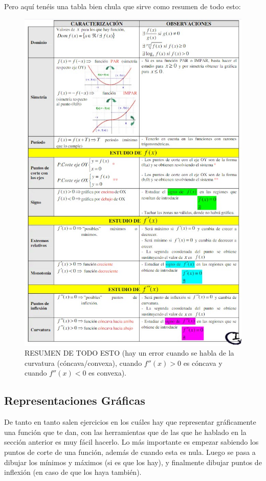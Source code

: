 \documentclass[arial,a4paper,print]{article}
\begin{document}
\begin{enumerate}
\pagebreak
Pero aquí tenéis una tabla bien chula que sirve como resumen de todo esto:
\begin{figure}[H]
	\centering
	\includegraphics[width=0.9\linewidth]{figures/resumen_analissi}
	\caption{RESUMEN DE TODO ESTO (hay un error cuando se habla de la curvatura (cóncava/convexa), cuando $f''(x) > 0$ es cóncava y cuando $f''(x) < 0$ es convexa).}
	\label{fig:resumenanalissi}
\end{figure}


\subsection{Representaciones Gráficas}

De tanto en tanto salen ejercicios en los cuáles hay que representar gráficamente una función que te dan, con las herramientas que de las que he hablado en la sección anterior es muy fácil hacerlo. Lo más importante es empezar sabiendo los puntos de corte de una función, además de cuando esta es nula. Luego se pasa a dibujar los mínimos y máximos (si es que los hay), y finalmente dibujar puntos de inflexión (en caso de que los haya también). 


\end{enumerate}
\end{document}
